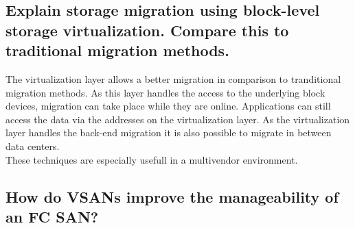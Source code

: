\subsection{Explain storage migration using block-level storage virtualization. Compare this to traditional migration methods.} %
\label{sub:explain_storage_migration_using_block_level_storage_virtualization_compare_this_to_tranditional_migration_methods}
	The virtualization layer allows a better migration in comparison to tranditional migration methods.
	As this layer handles the access to the underlying block devices,
	migration can take place while they are online.
	Applications can still access the data
	via the addresses on the virtualization layer.
	As the virtualization layer handles the back-end migration
	it is also possible to migrate in between data centers.\\
	These techniques are especially usefull in a multivendor environment.

\subsection{How do VSANs improve the manageability of an FC SAN?} %
\label{sub:how_do_vsans_improve_the_manageability_of_an_fc_san}


